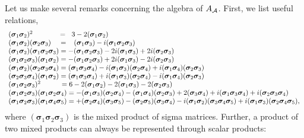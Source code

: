 \documentclass[a4paper]{jpconf}
\renewcommand\[{\begin{equation}}
\renewcommand\]{\end{equation}}
\newcommand{\ssigma}{{\bm \sigma}}
\newcommand{\A}{{\cal A}}
\begin{document}
Let us make several remarks concerning the algebra of $A_\A$. First, we list useful relations,
\[\begin{array}{l}
{({{\ssigma}_1}{{\ssigma}_2})^2}\qquad \quad {\mkern 1mu} {\mkern 1mu}  = \;\;{\mkern 1mu} 3 - 2({{\ssigma}_1}{{\ssigma}_2})\\
({{\ssigma}_1}{{\ssigma}_2})({{\ssigma}_2}{{\ssigma}_3})\;\;\;\; = \;\;\;({{\ssigma}_1}{{\ssigma}_3}) - i({{\ssigma}_1}{{\ssigma}_2}{{\ssigma}_3})\\
({{\ssigma}_1}{{\ssigma}_2})({{\ssigma}_1}{{\ssigma}_2}{{\ssigma}_3}) =  - ({{\ssigma}_1}{{\ssigma}_2}{{\ssigma}_3}) - 2i({{\ssigma}_1}{{\ssigma}_3}) + 2i({{\ssigma}_2}{{\ssigma}_3})\\
({{\ssigma}_1}{{\ssigma}_2}{{\ssigma}_3})({{\ssigma}_1}{{\ssigma}_2}) =  - ({{\ssigma}_1}{{\ssigma}_2}{{\ssigma}_3}) + 2i({{\ssigma}_1}{{\ssigma}_3}) - 2i({{\ssigma}_2}{{\ssigma}_3})\\
({{\ssigma}_1}{{\ssigma}_2})({{\ssigma}_2}{{\ssigma}_3}{{\ssigma}_4}) = ({{\ssigma}_1}{{\ssigma}_3}{{\ssigma}_4}) - i({{\ssigma}_1}{{\ssigma}_3})({{\ssigma}_2}{{\ssigma}_4}) + i({{\ssigma}_1}{{\ssigma}_4})({{\ssigma}_2}{{\ssigma}_3})\\
({{\ssigma}_2}{{\ssigma}_3}{{\ssigma}_4})({{\ssigma}_1}{{\ssigma}_2}) = ({{\ssigma}_1}{{\ssigma}_3}{{\ssigma}_4}) + i({{\ssigma}_1}{{\ssigma}_3})({{\ssigma}_2}{{\ssigma}_4}) - i({{\ssigma}_1}{{\ssigma}_4})({{\ssigma}_2}{{\ssigma}_3})\\
{({{\ssigma}_1}{{\ssigma}_2}{{\ssigma}_3})^2}{\mkern 1mu} {\mkern 1mu} {\mkern 1mu} \qquad {\mkern 1mu}  = 6 - 2({{\ssigma}_1}{{\ssigma}_2}) - 2({{\ssigma}_1}{{\ssigma}_3}) - 2({{\ssigma}_2}{{\ssigma}_3})\\
({{\ssigma}_1}{{\ssigma}_2}{{\ssigma}_3})({{\ssigma}_1}{{\ssigma}_2}{{\ssigma}_4}) =  - ({{\ssigma}_1}{{\ssigma}_3})({{\ssigma}_2}{{\ssigma}_4}) - ({{\ssigma}_1}{{\ssigma}_4})({{\ssigma}_2}{{\ssigma}_3}) + 2({{\ssigma}_3}{{\ssigma}_4}) + i({{\ssigma}_1}{{\ssigma}_3}{{\ssigma}_4}) + i({{\ssigma}_2}{{\ssigma}_3}{{\ssigma}_4})\\
({{\ssigma}_1}{{\ssigma}_2}{{\ssigma}_3})({{\ssigma}_1}{{\ssigma}_4}{{\ssigma}_5}) =  + ({{\ssigma}_2}{{\ssigma}_4})({{\ssigma}_3}{{\ssigma}_5}) - ({{\ssigma}_2}{{\ssigma}_5})({{\ssigma}_3}{{\ssigma}_4}) - i({{\ssigma}_1}{{\ssigma}_2})({{\ssigma}_3}{{\ssigma}_4}{{\ssigma}_5}) + i({{\ssigma}_1}{{\ssigma}_3})({{\ssigma}_2}{{\ssigma}_4}{{\ssigma}_5}),
\end{array}\]
where $({{\ssigma}_1}{{\ssigma}_2}{{\ssigma}_3})$ is the mixed product of sigma matrices. Further, a product of two mixed products can always be represented through scalar products:
\end{document}
